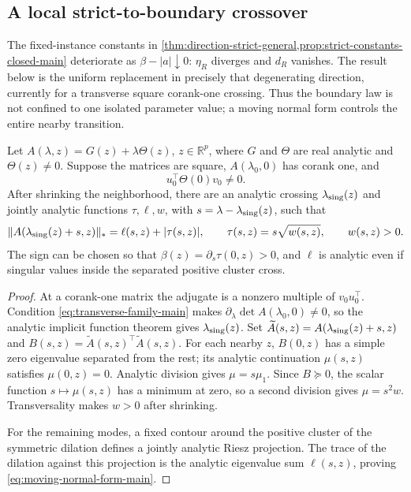 \subsection{A local strict-to-boundary crossover}

The fixed-instance constants in
\cref{thm:direction-strict-general,prop:strict-constants-closed-main}
deteriorate as \(\beta-|a|\downarrow0\): \(\eta_R\) diverges and \(d_R\)
vanishes.  The result below is the uniform replacement in precisely that
degenerating direction, currently for a transverse square corank-one
crossing.  Thus the boundary law is not confined to one isolated parameter
value; a moving normal form controls the entire nearby transition.

\begin{lemma}
\label{lem:moving-crossing-main}
Let \(A(\lambda,z)=G(z)+\lambda\Theta(z)\), \(z\in\mathbb R^p\), where
\(G\) and \(\Theta\) are real analytic and \(\Theta(z)\ne0\).  Suppose
the matrices are square, \(A(\lambda_0,0)\) has corank one, and
\begin{equation}
 u_0^\top\Theta(0)v_0\ne0.
 \label{eq:transverse-family-main}
\end{equation}
After shrinking the neighborhood, there are an analytic crossing
\(\lambda_{\rm sing}(z)\) and jointly analytic functions \(\tau,\ell,w\),
with \(s=\lambda-\lambda_{\rm sing}(z)\), such that
\begin{equation}
 \|A(\lambda_{\rm sing}(z)+s,z)\|_*
 =\ell(s,z)+|\tau(s,z)|,
 \qquad
 \tau(s,z)=s\sqrt{w(s,z)},\qquad w(s,z)>0.
 \label{eq:moving-normal-form-main}
\end{equation}
The sign can be chosen so that
\(\beta(z)=\partial_s\tau(0,z)>0\), and \(\ell\) is analytic even if
singular values inside the separated positive cluster cross.
\end{lemma}

\begin{proof}
At a corank-one matrix the adjugate is a nonzero multiple of
\(v_0u_0^\top\).  Condition \eqref{eq:transverse-family-main} makes
\(\partial_\lambda\det A(\lambda_0,0)\ne0\), so the analytic implicit
function theorem gives \(\lambda_{\rm sing}(z)\).  Set
\(\widetilde A(s,z)=A(\lambda_{\rm sing}(z)+s,z)\) and
\(B(s,z)=\widetilde A(s,z)^\top\widetilde A(s,z)\).  For each nearby \(z\),
\(B(0,z)\) has a simple zero eigenvalue separated from the rest; its analytic
continuation \(\mu(s,z)\) satisfies \(\mu(0,z)=0\).  Analytic division gives
\(\mu=s\mu_1\).  Since \(B\succeq0\), the scalar function
\(s\mapsto\mu(s,z)\) has a minimum at zero, so a second division gives
\(\mu=s^2w\).  Transversality makes \(w>0\) after shrinking.

For the remaining modes, a fixed contour around the positive cluster of the
symmetric dilation defines a jointly analytic Riesz projection.  The trace of
the dilation against this projection is the analytic eigenvalue sum
\(\ell(s,z)\), proving \eqref{eq:moving-normal-form-main}.
\end{proof}

